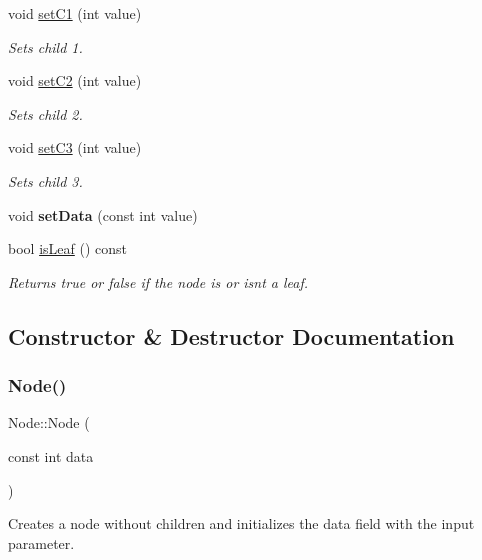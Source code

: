 \begin{DoxyCompactItemize}
void \hyperlink{classNode_ad6d91049f0851255bb064836405067be}{set\+C1} (int value)
\begin{DoxyCompactList}\small\item\em Sets child 1. \end{DoxyCompactList}\item 
void \hyperlink{classNode_aec5c9d9903b33dbb1bfef5b5dd351a49}{set\+C2} (int value)
\begin{DoxyCompactList}\small\item\em Sets child 2. \end{DoxyCompactList}\item 
void \hyperlink{classNode_a36d0038efe7fae34655f5c360008da6f}{set\+C3} (int value)
\begin{DoxyCompactList}\small\item\em Sets child 3. \end{DoxyCompactList}\item 
\mbox{\label{classNode_a66eb518ab2f277afef38d4306404fd7a}} 
void {\bfseries set\+Data} (const int value)
\item 
bool \hyperlink{classNode_a0c5b662d3bfbb856292a9aab878ed622}{is\+Leaf} () const
\begin{DoxyCompactList}\small\item\em Returns true or false if the node is or isn\textquotesingle{}t a leaf. \end{DoxyCompactList}\end{DoxyCompactItemize}


\subsection{Constructor \& Destructor Documentation}
\mbox{\label{classNode_a92589d30b37760493978baedac11c4af}} 
\subsubsection{\texorpdfstring{Node()}{Node()}}
{\footnotesize\ttfamily Node\+::\+Node (\begin{DoxyParamCaption}\item[{const int}]{data }\end{DoxyParamCaption})}



Creates a node without children and initializes the data field with the input parameter. 


